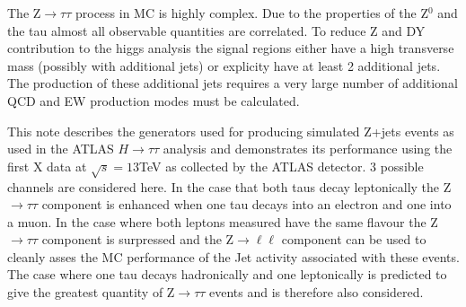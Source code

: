 The Z$\rightarrow\tau\tau$ process in MC is highly complex. Due to the properties of the Z$^0$ and the tau almost all observable quantities are correlated. To reduce Z and DY contribution to the higgs analysis the signal regions either have a high transverse mass (possibly with additional jets) or explicity have at least 2 additional jets. The production of these additional jets requires a very large number of additional QCD and EW production modes must be calculated.  

This note describes the generators used for producing simulated Z+jets events as used in the ATLAS $H\rightarrow\tau\tau$ analysis and demonstrates its performance using the first X data at $\sqrt{s}=13$TeV as collected by the ATLAS detector. 3 possible channels are considered here. In the case that both taus decay leptonically the Z$\rightarrow\tau\tau$ component is enhanced when one tau decays into an electron and one into a muon. In the case where both leptons measured have the same flavour the Z$\rightarrow\tau\tau$ component is surpressed and the Z$\rightarrow\ell\ell$ component can be used to cleanly asses the MC performance of the Jet activity associated with these events. The case where one tau decays hadronically and one leptonically is predicted to give the greatest quantity of Z$\rightarrow\tau\tau$ events and is therefore also considered.